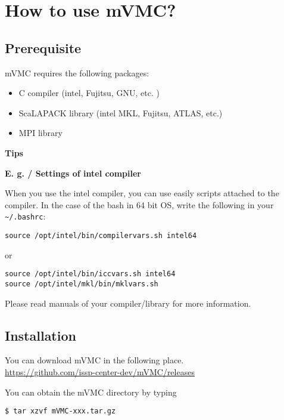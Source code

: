\chapter{How to use mVMC?}
\label{Ch:HowTo}

\section{Prerequisite}

mVMC requires the following packages:
\begin{itemize}
\item C compiler (intel, Fujitsu, GNU, etc. )
\item ScaLAPACK library (intel MKL, Fujitsu, ATLAS, etc.)
\item MPI library
\end{itemize}

\begin{screen}
\Large 
{\bf Tips}
\normalsize

{\bf E. g. / Settings of intel compiler}

When you use the intel compiler, you can use easily scripts attached to the compiler.
In the case of the bash in 64 bit OS, write the following in your \verb|~/.bashrc|:
\begin{verbatim}
source /opt/intel/bin/compilervars.sh intel64
\end{verbatim}
or
\begin{verbatim}
source /opt/intel/bin/iccvars.sh intel64
source /opt/intel/mkl/bin/mklvars.sh
\end{verbatim}

Please read manuals of your compiler/library for more information.

\end{screen}

\section{Installation}

You can download mVMC in the following place.\\
\url{https://github.com/issp-center-dev/mVMC/releases}

You can obtain the mVMC directory by typing
\begin{verbatim}
$ tar xzvf mVMC-xxx.tar.gz
\end{verbatim}

